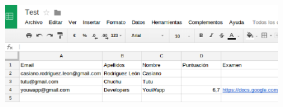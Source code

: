 \documentclass{beamer}
\begin{document}
\begin{frame}[allowframebreaks]
\begin{itemize}
    \begin{center}
      \includegraphics[width=0.9\textwidth]{img/app1.eps}
    \end{center}
    
  \end{itemize}
\end{frame}
\end{document}
